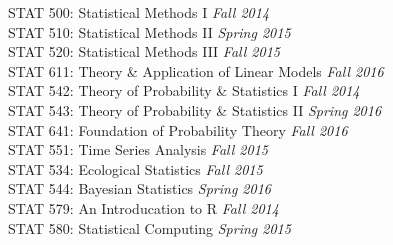 \documentclass[11pt, a4paper]{awesome-cv}
\begin{document}

STAT 500: Statistical Methods I \dotfill \textit{\small{Fall 2014}}\\
STAT 510: Statistical Methods II \dotfill \textit{\small{Spring 2015}}\\
STAT 520: Statistical Methods III \dotfill \textit{\small{Fall 2015}}\\
STAT 611: Theory \& Application of Linear Models \dotfill \textit{\small{Fall 2016}}\\
STAT 542: Theory of Probability \& Statistics I \dotfill \textit{\small{Fall 2014}}\\
STAT 543: Theory of Probability \& Statistics II \dotfill \textit{\small{Spring 2016}}\\
STAT 641: Foundation of Probability Theory \dotfill \textit{\small{Fall 2016}}\\
STAT 551: Time Series Analysis \dotfill \textit{\small{Fall 2015}}\\
STAT 534: Ecological Statistics \dotfill \textit{\small{Fall 2015}}\\
STAT 544: Bayesian Statistics \dotfill \textit{\small{Spring 2016}}\\
STAT 579: An Introducation to R \dotfill \textit{\small{Fall 2014}}\\
STAT 580: Statistical Computing \dotfill \textit{\small{Spring 2015}}
\end{document}
